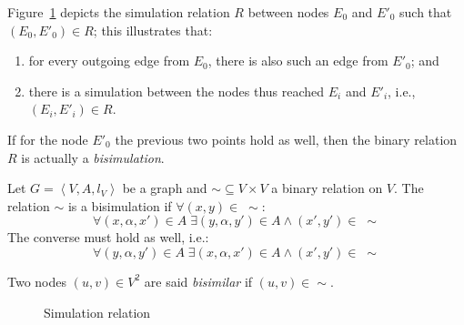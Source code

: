 Figure~\ref{fig:bisimulation} depicts the simulation relation $R$ between nodes $E_0$ and $E'_0$ such that $(E_0, E'_0) \in R$; this illustrates that:
\begin{enumerate}
	\item for every outgoing edge from $E_0$, there is also such an edge from $E'_0$; and
	\item there is a simulation between the nodes thus reached $E_i$ and $E'_i$, i.e., $(E_i, E'_i) \in R$.
\end{enumerate}
If for the node $E'_0$ the previous two points hold as well, then the binary relation $R$ is actually a \emph{bisimulation}.

\begin{definition}[Bisimulation]
Let $G=\left\langle V, A, l_V \right\rangle$ be a graph and $\sim \subseteq V \times V$ a binary relation on $V$.
The relation $\sim$ is a bisimulation if $\forall (x,y) \in\; \sim$:
\begin{equation*}
\forall (x, \alpha, x') \in A\; \exists (y, \alpha, y') \in A \wedge (x',y') \in\; \sim
\label{eq:b1}
\end{equation*}
The converse must hold as well, i.e.:
\begin{equation*}
\forall (y, \alpha, y') \in A\; \exists (x, \alpha, x') \in A \wedge (x',y') \in\; \sim
\label{eq:b2}
\end{equation*}
\end{definition}

\begin{remark}
Two nodes $(u, v) \in V^2$ are said \emph{bisimilar} if $(u, v) \in \sim$.
\end{remark}

\begin{figure}
	\centering
	\caption{Simulation relation}
	\label{fig:bisimulation}
\end{figure}

